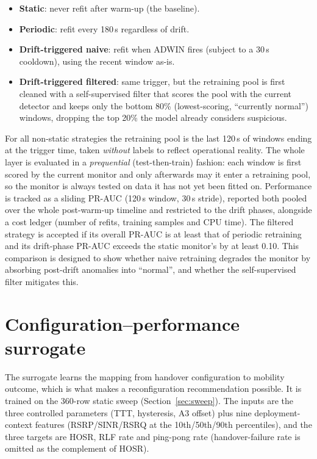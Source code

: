 \begin{itemize}
  \item \textbf{Static}: never refit after warm-up (the baseline).
  \item \textbf{Periodic}: refit every 180\,s regardless of drift.
  \item \textbf{Drift-triggered naive}: refit when ADWIN fires (subject to a
  30\,s cooldown), using the recent window as-is.
  \item \textbf{Drift-triggered filtered}: same trigger, but the retraining pool
  is first cleaned with a self-supervised filter that scores the pool with the
  current detector and keeps only the bottom 80\% (lowest-scoring, ``currently
  normal'') windows, dropping the top 20\% the model already considers
  suspicious.
\end{itemize}

For all non-static strategies the retraining pool is the last 120\,s of windows
ending at the trigger time, taken \emph{without} labels to reflect operational
reality. The whole layer is evaluated in a \emph{prequential}
(test-then-train) fashion: each window is first scored by the current monitor
and only afterwards may it enter a retraining pool, so the monitor is always
tested on data it has not yet been fitted on. Performance is tracked as a sliding
PR-AUC (120\,s window, 30\,s stride), reported both pooled over the whole
post-warm-up timeline and restricted to the drift phases, alongside a cost ledger
(number of refits, training samples and CPU time). The filtered strategy is accepted if its overall
PR-AUC is at least that of periodic retraining and its drift-phase PR-AUC
exceeds the static monitor's by at least 0.10. This comparison is designed to
show whether naive retraining degrades the monitor by absorbing post-drift
anomalies into ``normal'', and whether the self-supervised filter mitigates this.

\section{Configuration--performance surrogate}
\label{sec:surrogate}

The surrogate learns the mapping from handover configuration to mobility outcome,
which is what makes a reconfiguration recommendation possible. It is trained on
the 360-row static sweep (Section~\ref{sec:sweep}). The inputs are the three
controlled parameters (TTT, hysteresis, A3 offset) plus nine
deployment-context features (RSRP/SINR/RSRQ at the 10th/50th/90th percentiles),
and the three targets are HOSR, RLF rate and ping-pong rate (handover-failure
rate is omitted as the complement of HOSR).


